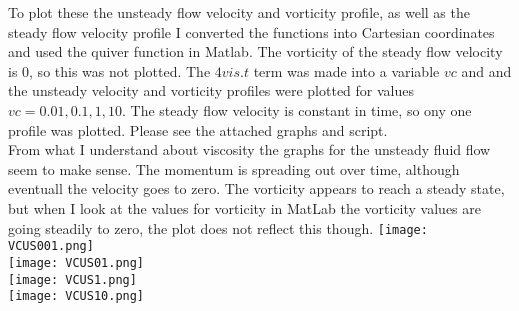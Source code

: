 \documentclass{article}
\begin{document}
\par
To plot these the unsteady flow velocity and vorticity profile, as well as the steady flow velocity profile I converted the functions into Cartesian coordinates and used the quiver function in Matlab. The vorticity of the steady flow velocity is 0, so this was not plotted. The $4vis. t$ term was made into a variable $vc$ and and the unsteady velocity and vorticity profiles were plotted for values $vc= {0.01,0.1,1,10}$. The steady flow velocity is constant in time, so ony one profile was plotted. Please see the attached graphs and script.\\
From what I understand about viscosity the graphs for the unsteady fluid flow seem to make sense. The momentum is spreading out over time, although eventuall the velocity goes to zero. The vorticity appears to reach a steady state, but when I look at the values for vorticity in MatLab the vorticity values are going steadily to zero, the plot does not reflect this though.
\texttt{[image: VCUS001.png]}\\
\texttt{[image: VCUS01.png]}\\
\texttt{[image: VCUS1.png]}\\
\texttt{[image: VCUS10.png]}\\
\end{document}
